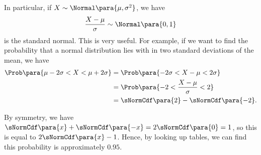 In particular, if \(X \sim \Normal\para{\mu, \sigma^2}\), we have
\[
    \frac{X - \mu}{\sigma} \sim \Normal\para{0, 1}
\]
is the standard normal. This is very useful. For example, if we want to find the probability that a normal distribution lies with in two standard deviations of the mean, we have
\begin{align*}
    \Prob\para{\mu - 2 \sigma < X < \mu + 2 \sigma} &= \Prob\para{-2\sigma < X - \mu < 2\sigma} \\
    &= \Prob\para{-2 < \frac{X - \mu}{\sigma} < 2} \\
    &= \sNormCdf\para{2} - \sNormCdf\para{-2}.
\end{align*}

By symmetry, we have \(\sNormCdf\para{x} + \sNormCdf\para{-x} = 2 \sNormCdf\para{0} = 1\), so this is equal to \(2 \sNormCdf\para{x} - 1\). Hence, by looking up tables, we can find this probability is approximately \(0.95\).